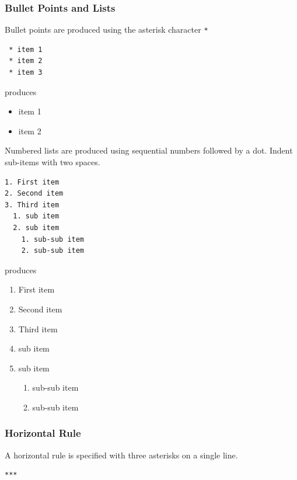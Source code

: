 \documentclass{book}
\providecommand{\tightlist}{%
      \setlength{\itemsep}{0pt}\setlength{\parskip}{0pt}}
\begin{document}
\subsubsection{Bullet Points and Lists}\label{bullet-points-and-lists}

Bullet points are produced using the asterisk character \lstinline!*!

\begin{lstlisting}
 * item 1
 * item 2
 * item 3
\end{lstlisting}

produces

\begin{itemize}
\tightlist
\item
  item 1
\item
  item 2
\end{itemize}

Numbered lists are produced using sequential numbers followed by a dot.
Indent sub-items with two spaces.

\begin{lstlisting}
1. First item
2. Second item
3. Third item
  1. sub item
  2. sub item
    1. sub-sub item
    2. sub-sub item
\end{lstlisting}

produces

\begin{enumerate}
\def\labelenumi{\arabic{enumi}.}
\tightlist
\item
  First item
\item
  Second item
\item
  Third item
\item
  sub item
\item
  sub item

  \begin{enumerate}
  \def\labelenumii{\arabic{enumii}.}
  \tightlist
  \item
    sub-sub item
  \item
    sub-sub item
  \end{enumerate}
\end{enumerate}

\subsubsection{Horizontal Rule}\label{horizontal-rule}

A horizontal rule is specified with three asterisks on a single line.

\begin{lstlisting}
***
\end{lstlisting}
\end{document}
